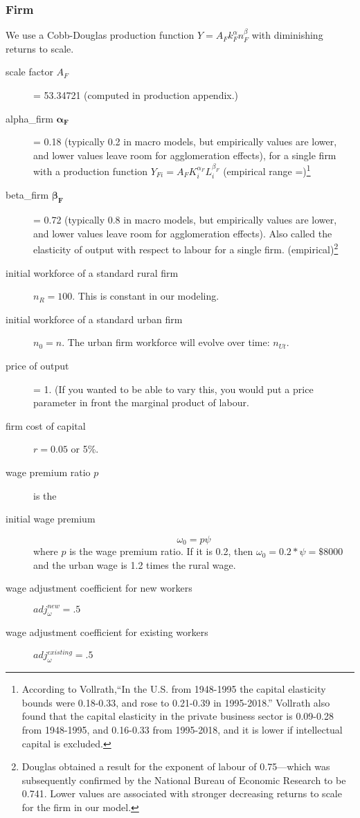 \subsubsection{Firm}
We use a Cobb-Douglas production function $Y=A_F k_F^\alpha  n_F^\beta$ with diminishing returns to scale. 

\begin{description}

\item [scale factor $A_F$] = 53.34721 (computed in production appendix.)

\item  [alpha\_firm  $\mathbf{\alpha_F}$] = 0.18 (typically 0.2 in macro models, but empirically values are lower, and lower values leave room for agglomeration effects),  for a single firm with a production function $Y_{Fi}=A_F K_i^{\alpha_F }L^{\beta_F}_i$ (empirical range =)\footnote{According to Vollrath,``In the U.S. from 1948-1995 the capital elasticity bounds were 0.18-0.33, and rose to 0.21-0.39 in 1995-2018.''\cite{vollrathElasticityAggregateOutput2021} Vollrath also found that the capital elasticity in the private business sector is 0.09-0.28 from 1948-1995, and 0.16-0.33 from 1995-2018, and it is lower if intellectual capital is excluded.}

\item  [beta\_firm $\mathbf{\beta_F}$] = 0.72 (typically 0.8 in macro models, but empirically values are lower, and lower values leave room for agglomeration effects). Also called the elasticity of output with respect to labour for a single firm. (empirical)\footnote{Douglas  obtained a result for the exponent of labour of 0.75—which was subsequently confirmed by the National Bureau of Economic Research to be 0.741. Lower values  are associated with stronger decreasing returns to scale for the firm in our model.} 
\item [initial workforce of a standard rural firm] $n_R=100$. This is constant in our modeling. 

\item [initial workforce of a standard urban firm] $n_0=n$.  The urban firm workforce will evolve over time: $n_{Ut}$. 

\item [price of output] = 1. (If you wanted to be able to vary this, you would put a price parameter in front the %
\gls{marginal product of labour}. %

\item [firm cost of capital] $r = 0.05$ or 5\%.
\item[wage premium ratio $p$] is the 
\item [initial wage premium]  
\[\omega_0 = p \psi\] 
where $p$ is the wage premium ratio. If it is 0.2, then $\omega_0= 0.2*\psi =\$8000$ and the urban wage is 1.2 times the rural wage.

\item [wage adjustment coefficient for new workers ] $adj^{new}_\omega=.5$

\item [wage adjustment coefficient for existing workers] $adj^{existing}_\omega=.5$
\end{description}
    

